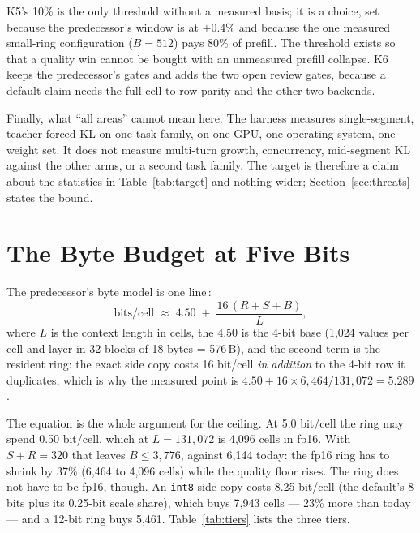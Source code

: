 \documentclass[10pt,twocolumn]{article}
\begin{document}
K5's 10\% is the only threshold without a measured basis; it is a choice, set because the predecessor's window is at $+0.4\%$ and because the one measured small-ring configuration ($B{=}512$) pays 80\% of prefill. The threshold exists so that a quality win cannot be bought with an unmeasured prefill collapse. K6 keeps the predecessor's gates and adds the two open review gates, because a default claim needs the full cell-to-row parity and the other two backends.

Finally, what ``all areas'' cannot mean here. The harness measures single-segment, teacher-forced KL on one task family, on one GPU, one operating system, one weight set. It does not measure multi-turn growth, concurrency, mid-segment KL against the other arms, or a second task family. The target is therefore a claim about the statistics in Table~\ref{tab:target} and nothing wider; Section~\ref{sec:threats} states the bound.

\section{The Byte Budget at Five Bits}\label{sec:bytes}

The predecessor's byte model is one line\,\cite{kvwin}:
\begin{equation}
\text{bits/cell} \;\approx\; 4.50 \;+\; \frac{16\,(R+S+B)}{L},
\label{eq:budget}
\end{equation}
where $L$ is the context length in cells, the 4.50 is the 4-bit base (1,024 values per cell and layer in 32 blocks of 18 bytes = 576\,B), and the second term is the resident ring: the exact side copy costs 16 bit/cell \emph{in addition} to the 4-bit row it duplicates, which is why the measured point is $4.50 + 16\times6{,}464/131{,}072 = 5.289$.

The equation is the whole argument for the ceiling. At 5.0 bit/cell the ring may spend 0.50 bit/cell, which at $L{=}131{,}072$ is 4,096 cells in fp16. With $S{+}R{=}320$ that leaves $B \le 3{,}776$, against 6,144 today: the fp16 ring has to shrink by 37\% (6,464 to 4,096 cells) while the quality floor rises. The ring does not have to be fp16, though. An \texttt{int8} side copy costs 8.25 bit/cell (the default's 8 bits plus its 0.25-bit scale share), which buys 7,943 cells --- 23\% more than today --- and a 12-bit ring buys 5,461. Table~\ref{tab:tiers} lists the three tiers.
\end{document}
